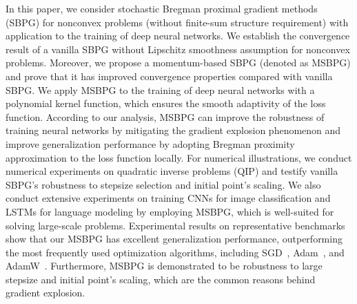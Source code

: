 \documentclass[twoside,11pt]{article}
\begin{document}
In this paper, we consider stochastic Bregman proximal gradient methods (SBPG) for nonconvex problems (without finite-sum structure requirement) with application to the training of deep neural networks. We establish the convergence result of a vanilla SBPG without Lipschitz smoothness assumption for nonconvex problems. Moreover, we propose a momentum-based SBPG (denoted as MSBPG) and prove that it has improved convergence properties compared with vanilla SBPG. We apply MSBPG to the training of deep neural networks with a polynomial kernel function, which ensures the smooth adaptivity of the loss function. According to our analysis, MSBPG can improve the robustness of training neural networks by mitigating the gradient explosion phenomenon and improve generalization performance
by adopting Bregman proximity approximation to the loss function locally. For numerical illustrations, we conduct numerical experiments on quadratic inverse problems (QIP) and testify vanilla SBPG's robustness to stepsize selection and {initial point's scaling}. We also conduct extensive experiments on training CNNs for image classification and LSTMs for language modeling by employing MSBPG, which is well-suited for solving large-scale problems. Experimental results on representative benchmarks show that our
MSBPG has excellent generalization performance, outperforming the most frequently used optimization algorithms, including SGD~\citep{robbins1951stochastic}, Adam~\citep{kingma2014adam}, and AdamW~\citep{loshchilov2017decoupled}. Furthermore, MSBPG is demonstrated to be robustness to large stepsize and initial point's scaling, which are the common reasons behind gradient explosion. 
\end{document}
